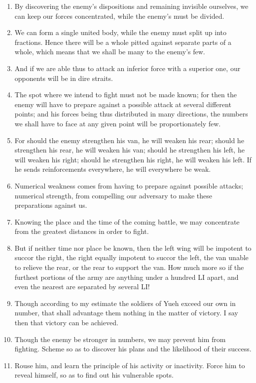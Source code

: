 \documentclass[oneside]{book}
\begin{document}
\begin{enumerate}
	\item By discovering the enemy's dispositions and remaining invisible ourselves, we can keep our forces concentrated, while the enemy's must be divided.
	\item We can form a single united body, while the enemy must split up into fractions. Hence there will be a whole pitted against separate parts of a whole, which means that we shall be many to the enemy's few.
	\item And if we are able thus to attack an inferior force with a superior one, our opponents will be in dire straits.
	\item The spot where we intend to fight must not be made known; for then the enemy will have to prepare against a possible attack at several different points; and his forces being thus distributed in many directions, the numbers we shall have to face at any given point will be proportionately few.
	\item For should the enemy strengthen his van, he will weaken his rear; should he strengthen his rear, he will weaken his van; should he strengthen his left, he will weaken his right; should he strengthen his right, he will weaken his left. If he sends reinforcements everywhere, he will everywhere be weak.
	\item Numerical weakness comes from having to prepare against possible attacks; numerical strength, from compelling our adversary to make these preparations against us.
	\item Knowing the place and the time of the coming battle, we may concentrate from the greatest distances in order to fight.
	\item But if neither time nor place be known, then the left wing will be impotent to succor the right, the right equally impotent to succor the left, the van unable to relieve the rear, or the rear to support the van. How much more so if the furthest portions of the army are anything under a hundred LI apart, and even the nearest are separated by several LI!
	\item Though according to my estimate the soldiers of Yueh exceed our own in number, that shall advantage them nothing in the matter of victory. I say then that victory can be achieved.
	\item Though the enemy be stronger in numbers, we may prevent him from fighting. Scheme so as to discover his plans and the likelihood of their success.
	\item Rouse him, and learn the principle of his activity or inactivity. Force him to reveal himself, so as to find out his vulnerable spots.

\end{enumerate}
\end{document}
